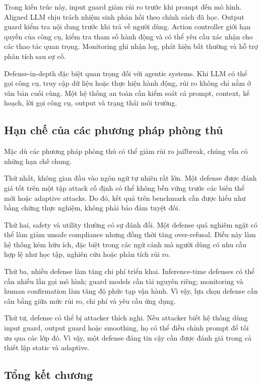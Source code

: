 Trong kiến trúc này, input guard giảm rủi ro trước khi prompt đến mô hình.
Aligned LLM chịu trách nhiệm sinh phản hồi theo chính sách đã học.
Output guard kiểm tra nội dung trước khi trả về người dùng. Action
controller giới hạn quyền của công cụ, kiểm tra tham số hành động và có
thể yêu cầu xác nhận cho các thao tác quan trọng. Monitoring ghi nhận log,
phát hiện bất thường và hỗ trợ phân tích sau sự cố.

Defense-in-depth đặc biệt quan trọng đối với agentic systems. Khi LLM có
thể gọi công cụ, truy cập dữ liệu hoặc thực hiện hành động, rủi ro không
chỉ nằm ở văn bản cuối cùng. Một hệ thống an toàn cần kiểm soát cả prompt,
context, kế hoạch, lời gọi công cụ, output và trạng thái môi trường.

\subsection{Hạn chế của các phương pháp phòng thủ}
\label{subsec:defense-limitations}

Mặc dù các phương pháp phòng thủ có thể giảm rủi ro jailbreak, chúng vẫn
có những hạn chế chung.

Thứ nhất, không gian đầu vào ngôn ngữ tự nhiên rất lớn. Một defense được
đánh giá tốt trên một tập attack cố định có thể không bền vững trước các
biến thể mới hoặc adaptive attacks. Do đó, kết quả trên benchmark cần được
hiểu như bằng chứng thực nghiệm, không phải bảo đảm tuyệt đối.

Thứ hai, safety và utility thường có sự đánh đổi. Một defense quá nghiêm
ngặt có thể làm giảm unsafe compliance nhưng đồng thời tăng over-refusal.
Điều này làm hệ thống kém hữu ích, đặc biệt trong các ngữ cảnh mà người
dùng có nhu cầu hợp lệ như học tập, nghiên cứu hoặc phân tích rủi ro.

Thứ ba, nhiều defense làm tăng chi phí triển khai. Inference-time defenses
có thể cần nhiều lần gọi mô hình; guard models cần tài nguyên riêng;
monitoring và human confirmation làm tăng độ phức tạp vận hành. Vì vậy,
lựa chọn defense cần cân bằng giữa mức rủi ro, chi phí và yêu cầu ứng dụng.

Thứ tư, defense có thể bị attacker thích nghi. Nếu attacker biết hệ thống
dùng input guard, output guard hoặc smoothing, họ có thể điều chỉnh prompt
để tối ưu qua các lớp đó. Vì vậy, một defense đáng tin cậy cần được đánh
giá trong cả thiết lập static và adaptive.

\subsection{Tổng kết chương}
\label{subsec:jailbreak-defenses-summary}

